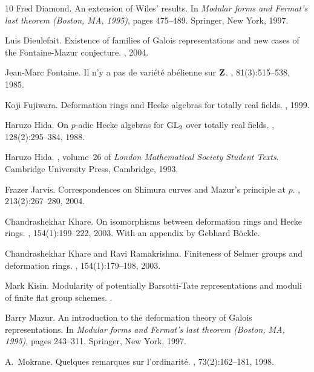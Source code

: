 \documentclass[12pt]{article}
\begin{document}
\begin{thebibliography}{10}
\bibitem{[D97]}
Fred Diamond.
\newblock An extension of {W}iles' results.
\newblock In {\em Modular forms and Fermat's last theorem (Boston, MA, 1995)},
  pages 475--489. Springer, New York, 1997.

Luis Dieulefait.
\newblock Existence of families of {G}alois representations and new cases of
  the {F}ontaine-{M}azur conjecture.
, 2004.

Jean-Marc Fontaine.
\newblock Il n'y a pas de vari\'et\'e ab\'elienne sur {${\bf Z}$}.
, 81(3):515--538, 1985.

Koji Fujiwara.
\newblock Deformation rings and {H}ecke algebras for totally real fields.
, 1999.

Haruzo Hida.
\newblock On {$p$}-adic {H}ecke algebras for {${\rm GL}\sb 2$} over totally
  real fields.
, 128(2):295--384, 1988.

Haruzo Hida.
,
  volume~26 of {\em London Mathematical Society Student Texts}.
\newblock Cambridge University Press, Cambridge, 1993.

Frazer Jarvis.
\newblock Correspondences on {S}himura curves and {M}azur's principle at {$p$}.
, 213(2):267--280, 2004.

\bibitem{[K03]}
Chandrashekhar Khare.
\newblock On isomorphisms between deformation rings and {H}ecke rings.
, 154(1):199--222, 2003.
\newblock With an appendix by Gebhard B\"ockle.

\bibitem{[KR03]}
Chandrashekhar Khare and Ravi Ramakrishna.
\newblock Finiteness of {S}elmer groups and deformation rings.
, 154(1):179--198, 2003.

Mark Kisin.
\newblock Modularity of potentially {B}arsotti-{T}ate representations and
  moduli of finite flat group schemes.
.

\bibitem{[M97]}
Barry Mazur.
\newblock An introduction to the deformation theory of {G}alois
  representations.
\newblock In {\em Modular forms and Fermat's last theorem (Boston, MA, 1995)},
  pages 243--311. Springer, New York, 1997.

A.~Mokrane.
\newblock Quelques remarques sur l'ordinarit\'e.
, 73(2):162--181, 1998.


\end{thebibliography}
\end{document}
